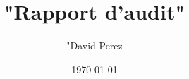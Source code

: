 \documentclass{article}
\begin{document}
\title{"Rapport d'audit"}
\author{"David Perez}
\date{\today}

\maketitle


\tableofcontents
\end{document}
